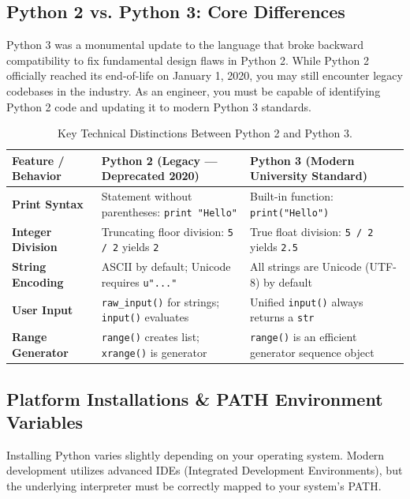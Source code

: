 \subsection{Python 2 vs. Python 3: Core Differences}

Python 3 was a monumental update to the language that broke backward compatibility to fix fundamental design flaws in Python 2. While Python 2 officially reached its end-of-life on January 1, 2020, you may still encounter legacy codebases in the industry. As an engineer, you must be capable of identifying Python 2 code and updating it to modern Python 3 standards.

\begin{table}[htbp]
\centering
\small
\renewcommand{\arraystretch}{1.3}
\begin{tabularx}{\linewidth}{l>{\raggedright\arraybackslash}X>{\raggedright\arraybackslash}X}
\toprule
\textbf{Feature / Behavior} & \textbf{Python 2 (Legacy --- Deprecated 2020)} & \textbf{Python 3 (Modern University Standard)} \\
\midrule
\textbf{Print Syntax} & Statement without parentheses: \texttt{print "Hello"} & Built-in function: \texttt{print("Hello")} \\
\textbf{Integer Division} & Truncating floor division: \texttt{5 / 2} yields \texttt{2} & True float division: \texttt{5 / 2} yields \texttt{2.5} \\
\textbf{String Encoding} & ASCII by default; Unicode requires \texttt{u"..."} & All strings are Unicode (UTF-8) by default \\
\textbf{User Input} & \texttt{raw\_input()} for strings; \texttt{input()} evaluates & Unified \texttt{input()} always returns a \texttt{str} \\
\textbf{Range Generator} & \texttt{range()} creates list; \texttt{xrange()} is generator & \texttt{range()} is an efficient generator sequence object \\
\bottomrule
\end{tabularx}
\caption{Key Technical Distinctions Between Python 2 and Python 3.}
\label{tab:py2-vs-py3}
\end{table}

\subsection{Platform Installations \& PATH Environment Variables}

Installing Python varies slightly depending on your operating system. Modern development utilizes advanced IDEs (Integrated Development Environments), but the underlying interpreter must be correctly mapped to your system's PATH.

